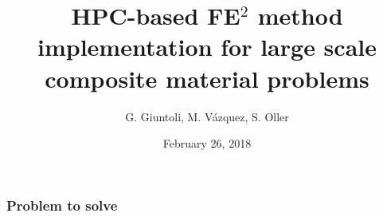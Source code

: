 \documentclass[usenames,dvipsnames]{beamer}
\title[Short title]{HPC-based FE$^2$ method implementation for large scale composite material problems}
\author{G. Giuntoli, M. V\'azquez, S. Oller} %
\institute[BSC-UPC] %
{
Barcelona Supercomputing Center\\Universitat Polit\`ecnica de Catalunya \\ %
\medskip
\textit{guido.giuntoli@bsc.es} %
}
\date{February 26, 2018} %
\begin{document}
\begin{frame}
\titlepage %
\end{frame}






\begin{frame}
\frametitle{Problem to solve}
\begin{figure}[!ht]
\resizebox{0.4\linewidth}{!}{}
\end{figure}
\end{frame}

\end{document}

